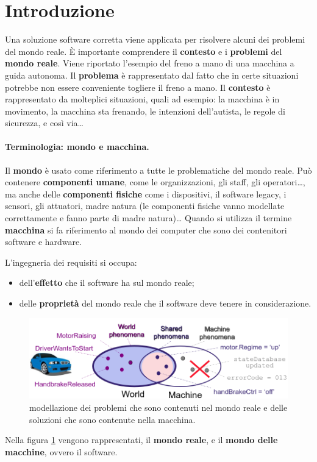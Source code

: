 \section{Introduzione}
Una soluzione software corretta viene applicata per risolvere alcuni dei problemi del mondo reale. È importante comprendere il \textbf{contesto} e i \textbf{problemi} del \textbf{mondo reale}.
Viene riportato l'esempio del freno a mano di una macchina a guida autonoma.
Il \textbf{problema} è rappresentato dal fatto che in certe situazioni potrebbe non essere conveniente togliere il freno a mano. Il \textbf{contesto} è rappresentato da molteplici situazioni, quali ad esempio: la macchina è in movimento, la macchina sta frenando, le intenzioni dell'autista, le regole di sicurezza, e così via\dots

\paragraph{Terminologia: mondo e macchina.} Il \textbf{mondo} è usato come riferimento a tutte le problematiche del mondo reale. Può contenere \textbf{componenti umane}, come le organizzazioni, gli staff, gli operatori\dots, ma anche delle \textbf{componenti fisiche} come i dispositivi, il software legacy, i sensori, gli attuatori, madre natura (le componenti fisiche vanno modellate correttamente e fanno parte di madre natura)\dots
Quando si utilizza il termine \textbf{macchina} si fa riferimento al mondo dei computer che sono dei contenitori software e hardware.

L'ingegneria dei requisiti si occupa:
\begin{itemize}
	\item dell'\textbf{effetto} che il software ha sul mondo reale;
	\item delle \textbf{proprietà} del mondo reale che il software deve tenere in considerazione.
\end{itemize}
\begin{figure}[th]
	\centering
	\includegraphics[width=0.7\linewidth]{img/word-machine-sets}
	\caption{modellazione dei problemi che sono contenuti nel mondo reale e delle soluzioni che sono contenute nella macchina.}
	\label{fig:word-machine-sets}
\end{figure}
Nella figura \ref{fig:word-machine-sets} vengono rappresentati, il \textbf{mondo reale}, e il \textbf{mondo delle macchine}, ovvero il software.

